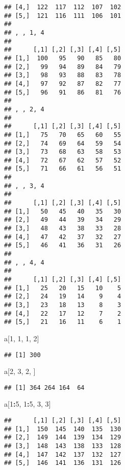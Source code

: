 \documentclass[]{article}
\newenvironment{Shaded}{\begin{snugshade}}{\end{snugshade}}
\newcommand{\DecValTok}[1]{\textcolor[rgb]{0.00,0.00,0.81}{#1}}
\newcommand{\OperatorTok}[1]{\textcolor[rgb]{0.81,0.36,0.00}{\textbf{#1}}}
\newcommand{\NormalTok}[1]{#1}
\begin{document}
\begin{verbatim}
## [4,]  122  117  112  107  102
## [5,]  121  116  111  106  101
## 
## , , 1, 4
## 
##      [,1] [,2] [,3] [,4] [,5]
## [1,]  100   95   90   85   80
## [2,]   99   94   89   84   79
## [3,]   98   93   88   83   78
## [4,]   97   92   87   82   77
## [5,]   96   91   86   81   76
## 
## , , 2, 4
## 
##      [,1] [,2] [,3] [,4] [,5]
## [1,]   75   70   65   60   55
## [2,]   74   69   64   59   54
## [3,]   73   68   63   58   53
## [4,]   72   67   62   57   52
## [5,]   71   66   61   56   51
## 
## , , 3, 4
## 
##      [,1] [,2] [,3] [,4] [,5]
## [1,]   50   45   40   35   30
## [2,]   49   44   39   34   29
## [3,]   48   43   38   33   28
## [4,]   47   42   37   32   27
## [5,]   46   41   36   31   26
## 
## , , 4, 4
## 
##      [,1] [,2] [,3] [,4] [,5]
## [1,]   25   20   15   10    5
## [2,]   24   19   14    9    4
## [3,]   23   18   13    8    3
## [4,]   22   17   12    7    2
## [5,]   21   16   11    6    1
\end{verbatim}

\begin{Shaded}
\begin{Highlighting}[]
\NormalTok{a[}\DecValTok{1}\NormalTok{, }\DecValTok{1}\NormalTok{, }\DecValTok{1}\NormalTok{, }\DecValTok{2}\NormalTok{]}
\end{Highlighting}
\end{Shaded}

\begin{verbatim}
## [1] 300
\end{verbatim}

\begin{Shaded}
\begin{Highlighting}[]
\NormalTok{a[}\DecValTok{2}\NormalTok{, }\DecValTok{3}\NormalTok{, }\DecValTok{2}\NormalTok{, ]}
\end{Highlighting}
\end{Shaded}

\begin{verbatim}
## [1] 364 264 164  64
\end{verbatim}

\begin{Shaded}
\begin{Highlighting}[]
\NormalTok{a[}\DecValTok{1}\OperatorTok{:}\DecValTok{5}\NormalTok{, }\DecValTok{1}\OperatorTok{:}\DecValTok{5}\NormalTok{, }\DecValTok{3}\NormalTok{, }\DecValTok{3}\NormalTok{]}
\end{Highlighting}
\end{Shaded}

\begin{verbatim}
##      [,1] [,2] [,3] [,4] [,5]
## [1,]  150  145  140  135  130
## [2,]  149  144  139  134  129
## [3,]  148  143  138  133  128
## [4,]  147  142  137  132  127
## [5,]  146  141  136  131  126
\end{verbatim}
\end{document}
